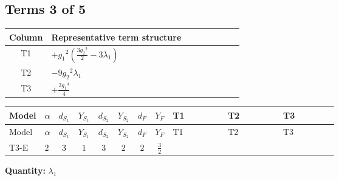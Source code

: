 \documentclass[8pt]{article}
\begin{document}
\begin{landscape}
\subsection*{Terms 3 of 5}
\begin{center}
\begin{tabular}{@{}c >{\raggedright\arraybackslash}p{0.82\linewidth}@{}}
\toprule
Column & Representative term structure \\
\midrule
T1 & \(\displaystyle +{g_1}^2 \left(\frac{3 {g_2}^2}{2}-3 {\lambda_1}\right)\) \\
\midrule
T2 & \(\displaystyle -9 {g_2}^2 {\lambda_1}\) \\
\midrule
T3 & \(\displaystyle +\frac{3 {g_1}^4}{4}\) \\
\midrule
\bottomrule
\end{tabular}
\end{center}
\smallskip
\tiny
\begin{longtable}{@{}llcccccc >{\raggedright\arraybackslash}p{0.21\linewidth} >{\raggedright\arraybackslash}p{0.21\linewidth} >{\raggedright\arraybackslash}p{0.21\linewidth}@{}}
\toprule
Model & $\alpha$ & $d_{S_1}$ & $Y_{S_1}$ & $d_{S_2}$ & $Y_{S_2}$ & $d_F$ & $Y_F$ & T1 & T2 & T3 \\
\midrule
\endfirsthead
\toprule
Model & $\alpha$ & $d_{S_1}$ & $Y_{S_1}$ & $d_{S_2}$ & $Y_{S_2}$ & $d_F$ & $Y_F$ & T1 & T2 & T3 \\
\midrule
\endhead
T3-E & $2$ & $3$ & $1$ & $3$ & $2$ & $2$ & $\frac{3}{2}$ & \scriptsize\adjustbox{max width=\linewidth}{$\begin{gathered} +{g_1}^2 \left(\frac{3 {g_2}^2}{2}-3 {\lambda_1}\right)\end{gathered}$} & \scriptsize\adjustbox{max width=\linewidth}{$\begin{gathered} -9 {g_2}^2 {\lambda_1}\end{gathered}$} & \scriptsize\adjustbox{max width=\linewidth}{$\begin{gathered} +\frac{3 {g_1}^4}{4}\end{gathered}$} \\
\midrule
\bottomrule
\end{longtable}
\clearpage
\noindent\textbf{Quantity: }$\lambda_1$\par\smallskip

\end{landscape}
\end{document}
